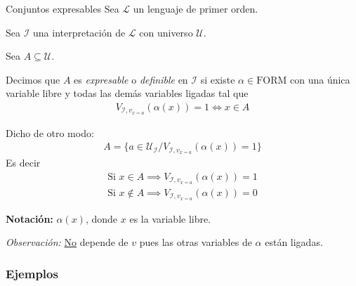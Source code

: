     \medskip

    \begin{definicion}{Conjuntos expresables}{}
        Sea $\mathcal{L}$ un lenguaje de primer orden.

        Sea $\mathcal{I}$ una interpretación de $\mathcal{L}$ con universo 
        $\mathcal{U}$.

        Sea $A \subseteq \mathcal{U}$.

        \medskip

        Decimos que $A$ es \textit{expresable} o \textit{definible} en 
        $\mathcal{I}$ si existe 
        $\alpha \in \mathrm{FORM}$
        con una única  variable libre y todas las demás 
        variables ligadas tal que
        \begin{gather*}
            V_{\mathcal{I}, v_{x=a}} (\alpha(x)) = 1 \iff x \in A
        \end{gather*}

        \medskip

        Dicho de otro modo:
        \begin{gather*}
            A = \{ a \in \mathcal{U}_{\mathcal{I}} /
            V_{\mathcal{I}, v_{x=a}} (\alpha(x))=1 \}
        \end{gather*}
        Es decir
        \begin{gather*}
            \text{Si } x \in A
            \implies V_{\mathcal{I}, v_{x=a}} (\alpha(x)) = 1 \\
            \text{Si } x \notin A
            \implies V_{\mathcal{I}, v_{x=a}} (\alpha(x)) = 0
        \end{gather*}

        \bigskip
        \textbf{Notación:}
        $\alpha(x)$, donde $x$ es la variable libre.
    \end{definicion}

    \bigskip
    \textit{Observación:}
    \underline{No} depende de $v$ pues las otras variables de $\alpha$ están 
    ligadas.

    \subsubsection{Ejemplos}

